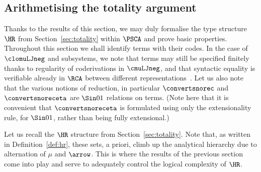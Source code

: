 \subsection{Arithmetising the totality argument}




Thanks to the results of this section, we may duly formalise the type structure $\HR$ from Section~\ref{sec:totality} within $\PSCA$ and prove basic properties.
% 
% 
Throughout this section we shall identify terms with their codes. In the case of $\clomuLJneg$ and subsystems, we note that terms may still be specified finitely thanks to regularity of coderivations in $\cmuLJneg$, and that syntactic equality is verifiable already in $\RCA$ between different representations~\cite{Das21:CT-preprint,Das21:CT-fscd}.
Let us also note that the various notions of reduction, in particular $\convertsnorec$ and $\convertsnoreceta $ are $\Sin 0 1$ relations on terms. (Note here that it is convenient that $\convertsnoreceta$ is formulated using only the extensionality rule, for $\Sin 0 1$, rather than being fully extensional.)

Let us recall the $\HR$ structure from Section~\ref{sec:totality}. 
Note that, as written in Definition~\ref{def:hr},
these sets, a priori, climb up the analytical hierarchy due to alternation of $\mu$ and $\arrow$.
This is where the results of the previous section come into play and serve to adequately control the logical complexity of $\HR$.





